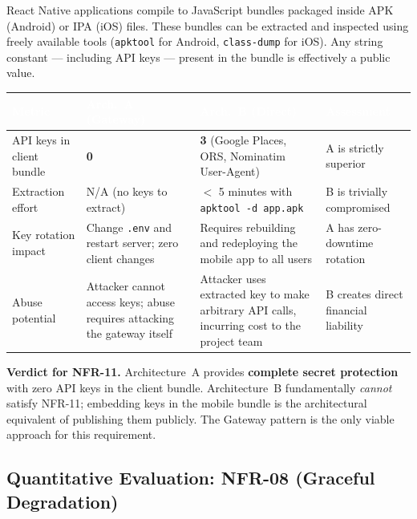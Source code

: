 \documentclass[12pt, a4paper]{article}
\newcommand{\thcell}[1]{\textcolor{white}{\textbf{\small #1}}}
\newcommand{\code}[1]{\texttt{\small #1}}
\begin{document}
React Native applications compile to JavaScript bundles packaged inside APK (Android) or IPA (iOS) files. These bundles can be extracted and inspected using freely available tools (\code{apktool} for Android, \code{class-dump} for iOS). Any string constant --- including API keys --- present in the bundle is effectively a public value.

\begin{longtable}{L{3.0cm} C{3.5cm} C{3.5cm} L{3.2cm}}
\toprule
{}
\thcell{Metric} & \thcell{Arch.\ A (Gateway)} & \thcell{Arch.\ B (Direct)} & \thcell{Assessment} \\
\midrule
\endhead
\bottomrule
\endfoot

API keys in client bundle & \textbf{0} & \textbf{3} (Google Places, ORS, Nominatim User-Agent) & A is strictly superior \\

Extraction effort & N/A (no keys to extract) & $<$ 5 minutes with \code{apktool -d app.apk} & B is trivially compromised \\

Key rotation impact & Change \code{.env} and restart server; zero client changes & Requires rebuilding and redeploying the mobile app to all users & A has zero-downtime rotation \\

Abuse potential & Attacker cannot access keys; abuse requires attacking the gateway itself & Attacker uses extracted key to make arbitrary API calls, incurring cost to the project team & B creates direct financial liability \\

\end{longtable}

\begin{tcolorbox}[notebox]
  \textbf{Verdict for NFR-11.} Architecture~A provides \textbf{complete secret protection} with zero API keys in the client bundle. Architecture~B fundamentally \emph{cannot} satisfy NFR-11; embedding keys in the mobile bundle is the architectural equivalent of publishing them publicly. The Gateway pattern is the only viable approach for this requirement.
\end{tcolorbox}

\subsection{Quantitative Evaluation: NFR-08 (Graceful Degradation)}
\end{document}
